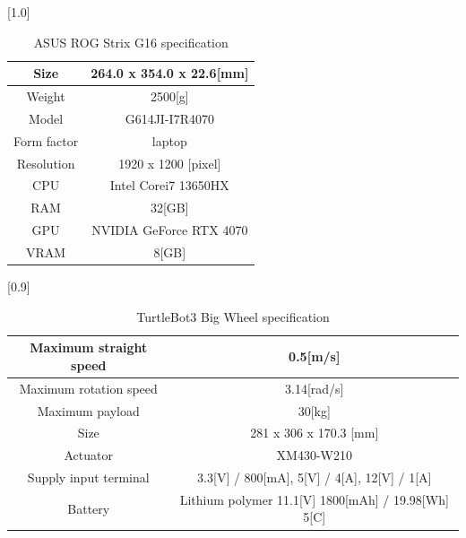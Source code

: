 \begin{table}[h]
  \begin{center}
    \caption{{ASUS ROG Strix G16 specification}\label{ASUS ROG Strix G16 specification}}
    \scalebox{1.2}[1.0]{
      \begin{tabular}{c|c} \hline
        Size & 264.0 x 354.0 x 22.6[mm]  \\ \hline
        Weight & 2500[g] \\ \hline
        Model & G614JI-I7R4070 \\ \hline
        Form factor & laptop \\ \hline
        Resolution & 1920 x 1200 [pixel] \\ \hline
        CPU & Intel Corei7 13650HX \\ \hline
        RAM & 32[GB] \\ \hline
        GPU & NVIDIA GeForce RTX 4070 \\ \hline
        VRAM & 8[GB] \\ \hline
      \end{tabular}
    }
  \end{center}
\end{table}

\begin{table}[h]
  \begin{center}
    \caption{{TurtleBot3 Big Wheel specification}\label{TurtleBot3 Big Wheel specification}}
    \scalebox{1.0}[0.9]{
      \begin{tabular}{c|c} \hline
        Maximum straight speed & 0.5[m/s] \\ \hline
        Maximum rotation speed & 3.14[rad/s] \\ \hline
        Maximum payload & 30[kg] \\ \hline
        Size & 281 x 306 x 170.3 [mm] \\ \hline
        Actuator & XM430-W210 \\ \hline
        Supply input terminal & 3.3[V] / 800[mA], 5[V] / 4[A], 12[V] / 1[A] \\ \hline
        Battery & Lithium polymer 11.1[V] 1800[mAh] / 19.98[Wh] 5[C] \\ \hline
      \end{tabular}
    }
  \end{center}
\end{table}

